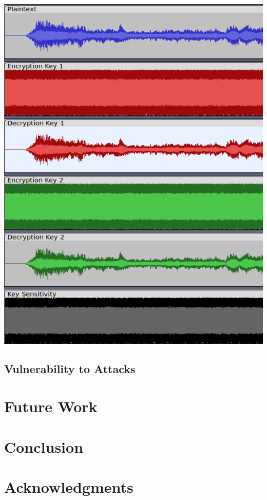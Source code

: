\documentclass[conference]{IEEEtran}
\begin{document}
\begin{center}
    \includegraphics[scale=.25]{figures/MKE}
\end{center}

\subsection{Vulnerability to Attacks}\label{subsec:vulnerability-to-attacks}

\section{Future Work}\label{sec:future-work}

\section{Conclusion}\label{sec:conclusion}

\section{Acknowledgments}\label{sec:acknowledgments}



\end{document}
